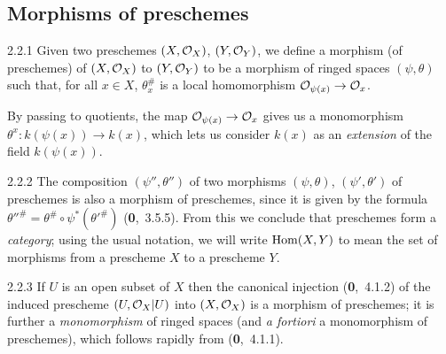 \documentclass[../main.tex]{subfiles}
\begin{document}
\subsection{Morphisms of preschemes}

\begin{cx}[Definition]{2.2.1}
    Given two preschemes $(X,\mathcal{O}_X)$, $(Y,\mathcal{O}_Y)$, we define a morphism (of preschemes) of $(X,\mathcal{O}_X)$ to $(Y,\mathcal{O}_Y)$ to be a morphism of ringed spaces $(\psi,\theta)$ such that, for all $x\in X$, $\theta_x^\#$ is a local homomorphism $\mathcal{O}_{\psi(x)}\to\mathcal{O}_x$.
\end{cx}

By passing to quotients, the map $\mathcal{O}_{\psi(x)}\to\mathcal{O}_x$ gives us a monomorphism $\theta^x\colon k(\psi(x))\to k(x)$, which lets us consider $k(x)$ as an \emph{extension} of the field $k(\psi(x))$.

\begin{cx}{2.2.2}
    The composition $(\psi'',\theta'')$ of two morphisms $(\psi,\theta)$, $(\psi',\theta')$ of preschemes is also a morphism of preschemes, since it is given by the formula $\theta''^\#=\theta^\#\circ\psi^*(\theta'^\#)$ (\textbf{0},~3.5.5).
    From this we conclude that preschemes form a \emph{category}; using the usual notation, we will write $\operatorname*{Hom}(X,Y)$ to mean the set of morphisms from a prescheme $X$ to a prescheme $Y$.
\end{cx}

\begin{cx}[Example]{2.2.3}
    If $U$ is an open subset of $X$ then the canonical injection (\textbf{0},~4.1.2) of the induced prescheme $(U,\mathcal{O}_X|U)$ into $(X,\mathcal{O}_X)$ is a morphism of preschemes; it is further a \emph{monomorphism} of ringed spaces (and \emph{a fortiori} a monomorphism of preschemes), which follows rapidly from (\textbf{0},~4.1.1).
\end{cx}
\end{document}
